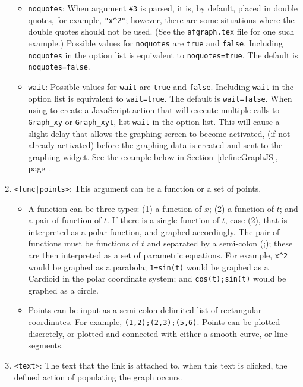 \documentclass{article}
\begin{document}
\begin{enumerate}
\begin{itemize}
    \item\texttt{noquotes}: When argument \texttt{\#3} is parsed, it
        is, by default, placed in double quotes, for example,
        \verb!"x^2"!; however, there are some situations where the
        double quotes should not be used. (See the \texttt{afgraph.tex}
        file for one such example.) Possible values for
        \texttt{noquotes} are \texttt{true} and \texttt{false}.
        Including \texttt{noquotes} in the option list is equivalent to
        \texttt{noquotes=true}. The default is \texttt{noquotes=false}.

    \item\texttt{wait}: Possible values for \texttt{wait} are
        \texttt{true} and \texttt{false}. Including \texttt{wait} in the
        option list is equivalent to \texttt{wait=true}. The default is
        \texttt{wait=false}. When using  to create a
        JavaScript action that will execute multiple calls to
        \texttt{Graph\_xy} or \texttt{Graph\_xyt}, list \texttt{wait} in
        the option list. This will cause a slight delay that allows the
        graphing screen to become activated, (if not already activated)
        before the graphing data is created and sent to the {\AcroFLeX}
        graphing widget. See the example below in
        \hyperref[defineGraphJS]{Section~\ref*{defineGraphJS}},
        page~\pageref*{defineGraphJS}.
    \end{itemize}
  \item \texttt{<func\string|points>}: This argument can be a function or a set of points.
  \begin{itemize}
    \item A function can be three types: (1) a function of $x$; (2)
        a function of $t$; and a pair of function of $t$.  If there is a
        single function of $t$, case (2), that is interpreted as a polar
        function, and graphed accordingly. The pair of functions must be
        functions of $t$ and separated by a semi-colon (;); these are
        then interpreted as a set of parametric equations. For example,
        \verb!x^2! would be graphed as a parabola; \verb!1+sin(t)! would
        be graphed as a Cardioid in the polar coordinate system; and
        \verb!cos(t);sin(t)! would be graphed as a circle.

    \item Points can be input as a semi-colon-delimited list of
        rectangular coordinates. For example, \verb!(1,2);(2,3);(5,6)!.
        Points can be plotted discretely, or plotted and connected with
        either a smooth curve, or line segments.
  \end{itemize}
  \item \texttt{<text>}: The text that the link is attached to, when
      this text is clicked, the defined action of populating the graph
      occurs.
\end{enumerate}
\end{document}
